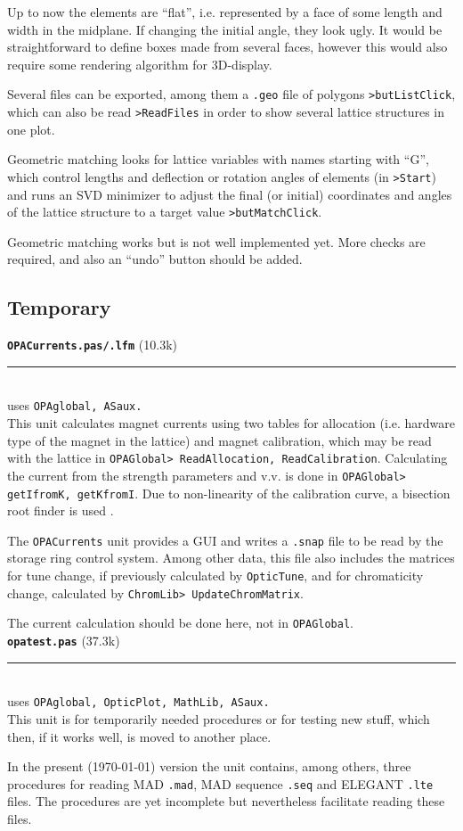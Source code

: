 \documentclass[12pt]{article}
\newcommand\code[1]{{\tt #1}}
\newcommand{\todo}[1]{{\color{red} #1}}
\newcommand\opamodule[3]{{\bf \tt #1} #2\\  \rule[3pt]{\textwidth}{0.2pt} \\ {\scriptsize uses \tt  #3}\\[1ex]}
\begin{document}
\todo{Up to now the elements are ``flat'', i.e. represented by a face of some length and width in the midplane. If changing the initial angle, they look ugly. It would be straightforward to define boxes made from several faces, however this would also require some rendering algorithm for 3D-display.}

Several files can be exported, among them a \code{.geo} file of polygons \code{>butListClick}, which can also be read \code{>ReadFiles} in order to show several lattice structures in one plot.

Geometric matching looks for lattice variables with names starting with ``G'', which control lengths and deflection or rotation angles of elements (in \code{>Start}) and runs an SVD minimizer to adjust the final (or initial) coordinates and angles of the lattice structure to a target value \code{>butMatchClick}.

\todo{Geometric matching works but is not well implemented yet. More checks are required, and also an ``undo'' button should be added.}


\subsection{Temporary}
\opamodule{OPACurrents.pas/.lfm}{(10.3k)}{OPAglobal, ASaux.}
This unit calculates magnet currents using two tables for allocation (i.e. hardware type of the magnet in the lattice) and magnet calibration, which may be read with the lattice in \code{OPAGlobal> ReadAllocation, ReadCalibration}. Calculating the current from the strength parameters and v.v. is done in \code{OPAGlobal> getIfromK, getKfromI}. Due to non-linearity of the calibration curve, a bisection root finder is used \cite{numrec}.

The {\tt OPACurrents} unit provides a GUI and writes a {\tt .snap} file to be read by the storage ring control system. Among other data, this file also includes the matrices for tune change, if previously calculated by \code{OpticTune}, and for chromaticity change, calculated by \code{ChromLib> UpdateChromMatrix}.

\todo{The current calculation should be done here, not in {\tt OPAGlobal}.}\\


\opamodule{opatest.pas}{(37.3k)}{OPAglobal, OpticPlot, MathLib, ASaux.}
This unit is for temporarily needed procedures or for testing new stuff, which then, if it works well, is moved to another place.

In the present (\today) version the unit contains, among others, three procedures for reading MAD {\tt .mad}, MAD sequence {\tt .seq} and ELEGANT {\tt .lte} files. The procedures are yet incomplete but nevertheless facilitate reading these files.\\
\end{document}
